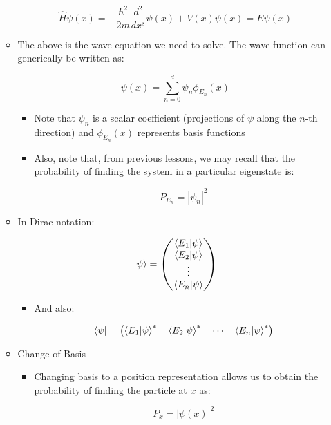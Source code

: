 \begin{itemize}
\begin{itemize}
        $$\hat{H}\psi(x)=-\frac{\hbar^2}{2m}\frac{d^2}{dx^s}\psi(x)+V(x)\psi(x)=E\psi(x)$$

      \item The above is the wave equation we need to solve. The wave function can generically be written as:

        $$\psi(x)=\sum_{n=0}^d\psi_n\phi_{E_n}(x)$$

        \begin{itemize}

          \item Note that $\psi_n$ is a scalar coefficient (projections of $\psi$ along the $n$-th direction) and $\phi_{E_n}(x)$ represents basis functions

          \item Also, note that, from previous lessons, we may recall that the probability of finding the system in a particular eigenstate is:

            $$P_{E_n}=|\psi_n|^2$$

        \end{itemize}

      \item In Dirac notation:

        $$\ket{\psi}=\left( \begin{matrix} \bra{E_1}\ket{\psi}\\ \bra{E_2}\ket{\psi}\\\vdots\\\bra{E_n}\ket{\psi} \end{matrix} \right)$$

        \begin{itemize}

          \item And also:

            $$\bra{\psi}=\left( \bra{E_1}\ket{\psi}^*\quad\bra{E_2}\ket{\psi}^*\quad\cdots\quad\bra{E_n}\ket{\psi}^* \right)$$

        \end{itemize}

      \item Change of Basis

        \begin{itemize}

          \item Changing basis to a position representation allows us to obtain the probability of finding the particle at $x$ as:

            $$P_x=|\psi(x)|^2$$


\end{itemize}
\end{itemize}
\end{itemize}
